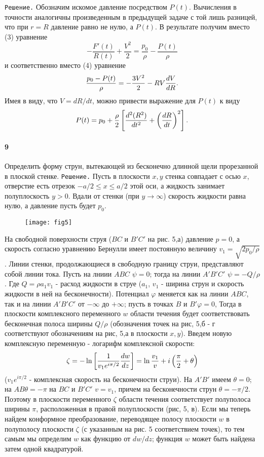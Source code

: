 \texttt{Решение.} Обозначим искомое давление посредством $P(t)$. Вычисления в
точности аналогичны произведенным в предыдущей задаче с той лишь разницей, что
при $r=R$ давление равно не нулю, а $P(t)$. В результате получим вместо
(3) уравнение
\[
   - \frac{F'(t)}{R(t)} + \frac{V^2}{2} = \frac{p_0}{\rho} - \frac{P(t)}{\rho}
\]
и соответственно вместо (4) уравнение
\[
   \frac{p_0 - P(t)}{\rho} = - \frac{3V^2}{2} - RV \frac{d{V}}{d{R}}.
\]
Имея в виду, что $V=dR/dt$, можно привести выражение для $P(t)$ к виду
\[
   P(t) = p_0 + \frac{\rho}{2}\left\lbrack \frac{d^2(R^2)}{dt^2} +
   \left( \frac{d{R}}{d{t}} \right)^2 \right\rbrack.
\]

\paragraph*{9}
Определить  форму  струн,  вытекающей   из   бесконечно  длинной   щели
прорезанной в плоской стенке.
\texttt{Решение.} Пусть в плоскости $x,y$ стенка совпадает с осью $x$,
отверстие есть отрезок $-a/2 \leq x \leq a/2$ этой оси, а жидкость занимает
полуплоскость $y>0$. Вдали от стенки (при $y \to \infty$) скорость жидкости
равна нулю, а давление пусть будет $p_0$.

\begin{figure}[hb]
  \centering
  \texttt{[image: fig5]}
  \caption{\label{fig:f5}}
\end{figure}

На свободной поверхности струя ($BC$ и $B'C'$ на рис. 5,а) давление $p=0$, а
скорость согласно уравнению Бернулли имеет постоянную величину $v_1 =
\sqrt{2p_0/\rho}$. Линии стенки, продолжающиеся в свободную границу струи,
представляют собой линии тока. Пусть на лниии $ABC$ $\psi = 0$; тогда на линии
$A'B'C'$ $\psi = -Q/\rho$. Где $Q = \rho a_1 v_1$ - расход жидкости в струе
($a_1$, $v_1$ - ширина струн и скорость жидкости в ней на бесконечности).
Потенциал $\varphi$ меняется как на линии $ABC$, так и на линии $A'B'C'$ от
$-\infty$ до $+\infty$; пусть в точках $B$ и $B' \varphi = 0$, Тогда в плоскости
комплексного переменного $w$ области течения будет соответствовать бесконечная
полоса ширины $Q/\rho$ (обозначения точек на рис, 5,б - г соответствуют
обозначениям на рис, 5,а в плоскости $x,y$). Введем новую комплексную переменную
- логарифм комплексной скорости:
\begin{equation}
   \label{eq:10t9.1}
   \zeta = - \ln \left\lbrack \frac1{v_1 e^{i\pi/2}} \frac{d{w}}{d{z}} \right\rbrack =
   \ln \frac{v_1}{v} + i \left( \frac{\pi}{2} + \theta \right)
\end{equation}
($v_1 e^{i\pi/2}$ - комплексная скорость на бесконечности струи). На $A'B'$
имеем $\theta = 0$; на $AB \theta = - \pi$ на $BC$ и $B'C'$ $v=v_1$, причем на
бесконечности струн $\theta = - \pi/2$. Поэтому в плоскости переменного $\zeta$
области течения соответствует полуполоса ширины $\pi$, расположенная в правой
полуплоскости (рис, 5, в). Если мы теперь найдем конформное преобразование,
переводящее полосу плоскости $w$ в полуполосу плоскости $\zeta$ (с указанным на
рис. 5 соответствием точек), то тем самым мы определим $w$ как функцию от
$dw/dz$; функция $w$ может быть найдена затем одной квадратурой.

